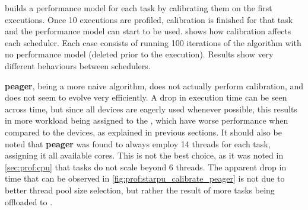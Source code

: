 \documentclass[main.tex]{subfiles}
\begin{document}
\starpu builds a performance model for each task by calibrating them on the first executions. Once 10 executions are profiled, calibration is finished for that task and the performance model can start to be used.  shows how calibration affects each scheduler. Each case consists of running 100 iterations of the algorithm with no performance model (deleted prior to the execution).
Results show very different behaviours between schedulers.

\textbf{peager}, being a more naive algorithm, does not actually perform calibration, and does not seem to evolve very efficiently. A drop in execution time can be seen across time, but since all devices are eagerly used whenever possible, this results in more workload being assigned to the \cpus, which have worse performance when compared to the \cuda devices, as explained in previous sections. It should also be noted that \textbf{peager} was found to always employ 14 \openmp threads for each task, assigning it all available cores. This is not the best choice, as it was noted in \cref{sec:prof:cpu} that tasks do not scale beyond 6 threads. The apparent drop in \cpu time that can be observed in \cref{fig:prof:starpu_calibrate_peager} is not due to better thread pool size selection, but rather the result of more tasks being offloaded to \gpus.
\end{document}
